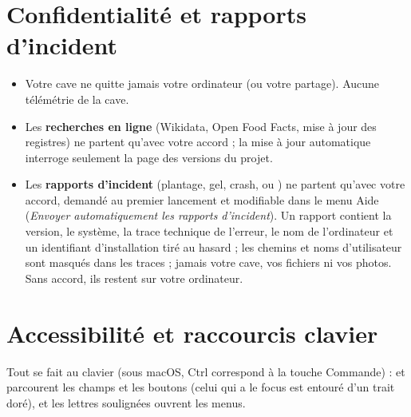 \documentclass[11pt,a4paper]{article}
\begin{document}
\section{Confidentialité et rapports d'incident}
\label{sec:confidentialite}
\begin{itemize}
  \item Votre cave ne quitte jamais votre ordinateur (ou votre partage). Aucune télémétrie de la cave.
  \item Les \textbf{recherches en ligne} (Wikidata, Open Food Facts, mise à jour des registres) ne partent
        qu'avec votre accord ; la mise à jour automatique interroge seulement la page des versions du projet.
  \item Les \textbf{rapports d'incident} (plantage, gel, crash, ou )
        ne partent qu'avec votre accord, demandé au premier lancement et modifiable dans le menu Aide
        (\emph{Envoyer automatiquement les rapports d'incident}). Un rapport contient la version, le système,
        la trace technique de l'erreur, le nom de l'ordinateur et un identifiant d'installation tiré au
        hasard ; les chemins et noms d'utilisateur sont masqués dans les traces ; jamais votre cave, vos
        fichiers ni vos photos. Sans accord, ils restent sur votre ordinateur.
\end{itemize}

\section{Accessibilité et raccourcis clavier}
Tout se fait au clavier (sous macOS, Ctrl correspond à la touche Commande) :  et  parcourent les champs et les boutons (celui qui
a le focus est entouré d'un trait doré),  et les lettres soulignées ouvrent les menus.
\end{document}
